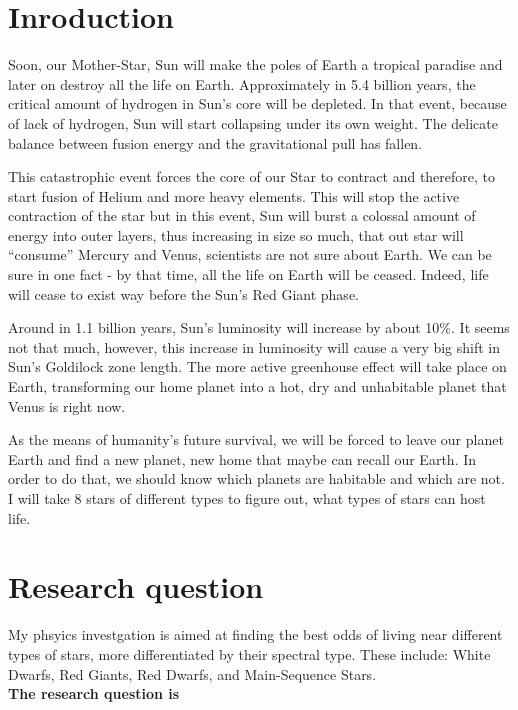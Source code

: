 \documentclass[a4paper,12pt]{article}
\begin{document}
\newpage

\section{Inroduction}

Soon, our Mother-Star, Sun will make the poles of Earth a tropical paradise and later on destroy all the life on Earth. Approximately in 5.4 billion years, the critical amount of hydrogen in Sun's core will be depleted. In that event, because of lack of hydrogen, Sun will start collapsing under its own weight. The delicate balance between fusion energy and the gravitational pull has fallen.

This catastrophic event forces the core of our Star to contract and therefore, to start fusion of Helium and more heavy elements. This will stop the active contraction of the star but in this event, Sun will burst a colossal amount of energy into outer layers, thus increasing in size so much, that out star will ``consume'' Mercury and Venus, scientists are not sure about Earth. We can be sure in one fact -  by that time, all the life on Earth will be ceased. Indeed, life will cease to exist way before the Sun's Red Giant phase.

Around in 1.1 billion years, Sun's luminosity will increase by about 10\%. It seems not that much, however, this increase in luminosity will cause a very big shift in Sun's Goldilock zone length. The more active greenhouse effect will take place on Earth, transforming our home planet into a hot, dry and unhabitable planet that Venus is right now.~\cite{sun}

As the means of humanity's future survival, we will be forced to leave our planet Earth and find a new planet, new home that maybe can recall our Earth. In order to do that, we should know which planets are habitable and which are not. I will take 8 stars of different types to figure out, what types of stars can host life.

\section{Research question}

My phsyics investgation is aimed at finding the best odds of living near different types of stars, more differentiated by their spectral type. These include: White Dwarfs, Red Giants, Red Dwarfs, and Main-Sequence Stars.\\

\textbf{The research question is}
\end{document}
